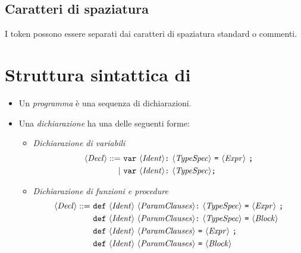 \subsection*{Caratteri di spaziatura}
I token possono essere separati dai caratteri di spaziatura standard o commenti.

\section{Struttura sintattica di \SBF}
\begin{itemize}
	\item Un \emph{programma} è una sequenza di dichiarazioni.
	
	\item Una \emph{dichiarazione} ha una delle seguenti forme:
	\begin{itemize}
		\item \emph{Dichiarazione di variabili}
		\begin{align*}
		\token{Decl} ::=\ &\texttt{var}\ \token{Ident} \texttt{:}\ \token{TypeSpec}\ \texttt{=}\ \token{Expr}\ \texttt{;}\\
		|\ &\texttt{var}\ \token{Ident} \texttt{:}\ \token{TypeSpec} \texttt{;}
		\end{align*}
		
		\item \emph{Dichiarazione di funzioni e procedure}
		\begin{align*}
		\token{Decl} ::=\ & \texttt{def}\ \token{Ident}\ \token{ParamClauses} \texttt{:}\ \token{TypeSpec}\ \texttt{=}\ \token{Expr}\ \texttt{;}\\
		& \texttt{def}\ \token{Ident}\ \token{ParamClauses} \texttt{:}\ \token{TypeSpec}\ \texttt{=}\ \token{Block}\\
		& \texttt{def}\ \token{Ident}\ \token{ParamClauses}\ \texttt{=}\ \token{Expr}\ \texttt{;}\\
		& \texttt{def}\ \token{Ident}\ \token{ParamClauses}\ \texttt{=}\ \token{Block}
		\end{align*}
		

\end{itemize}
\end{itemize}
